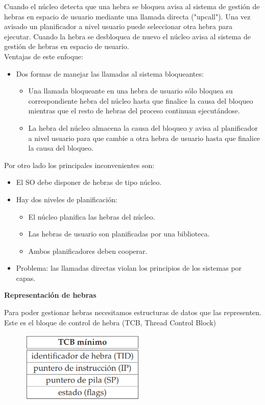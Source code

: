 \documentclass{article}
\begin{document}
Cuando el núcleo detecta que una hebra se bloquea avisa al sistema de gestión de hebras en espacio de usuario mediante una llamada directa ("upcall"). Una vez avisado un planificador a nivel usuario puede seleccionar otra hebra para ejecutar. Cuando la hebra se desbloquea de nuevo el núcleo avisa al sistema de gestión de hebras en espacio de usuario.\\

Ventajas de este enfoque:
	\begin{itemize}
	\item Dos formas de manejar las llamadas al sistema bloqueantes:
		\begin{itemize}
		\item Una llamada bloqueante en una hebra de usuario sólo bloquea su correspondiente hebra del núcleo hasta que finalice la causa del bloqueo mientras que el resto de hebras del proceso continuan ejecutándose.
		
		\item La hebra del núcleo almacena la causa del bloqueo y avisa al planificador a nivel usuario para que cambie a otra hebra de usuario hasta que finalice la causa del bloqueo.
		\end{itemize}
	\end{itemize}
	
Por otro lado los principales inconvenientes son:
	\begin{itemize}
	\item El SO debe disponer de hebras de tipo núcleo.
	
	\item Hay dos niveles de planificación:
		\begin{itemize}
		\item El núcleo planifica las hebras del núcleo.
		
		\item Las hebras de usuario son planificadas por una biblioteca.
		
		\item Ambos planificadores deben cooperar.
		\end{itemize}
	
	\item Problema: las llamadas directas violan los principios de los sistemas por capas.
	\end{itemize}
	
\textbf{Representación de hebras}

Para poder gestionar hebras necesitamos estructuras de datos que las representen. Este es el bloque de control de hebra (TCB, Thread Control Block)

\begin{figure}[h]
\centering
\includegraphics[scale=1,width=60mm]{tcb.png}
\end{figure}
\end{document}

